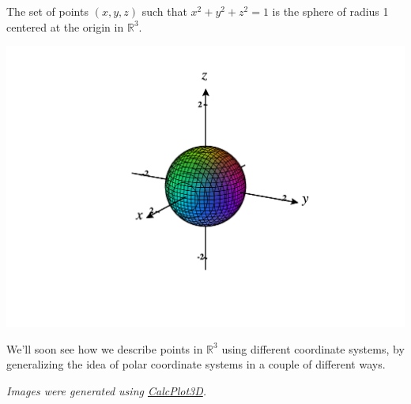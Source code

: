 \documentclass{ximera}
\begin{document}
\begin{example}
The set of points $(x,y,z)$ such that $x^2+y^2+z^2 = 1$ is the sphere of radius 1 centered at the origin in $\mathbb{R}^3$.

\begin{image}
\includegraphics[width=\textwidth]{CalcPlot3D-unit_sphere}
\end{image}

\end{example}

We'll soon see how we describe points in $\mathbb{R}^3$ using different coordinate systems, by generalizing the idea of polar coordinate systems in a couple of different ways.

\textit{Images were generated using \href{https://www.monroecc.edu/faculty/paulseeburger/calcnsf/CalcPlot3D/}{CalcPlot3D}.}
\end{document}
